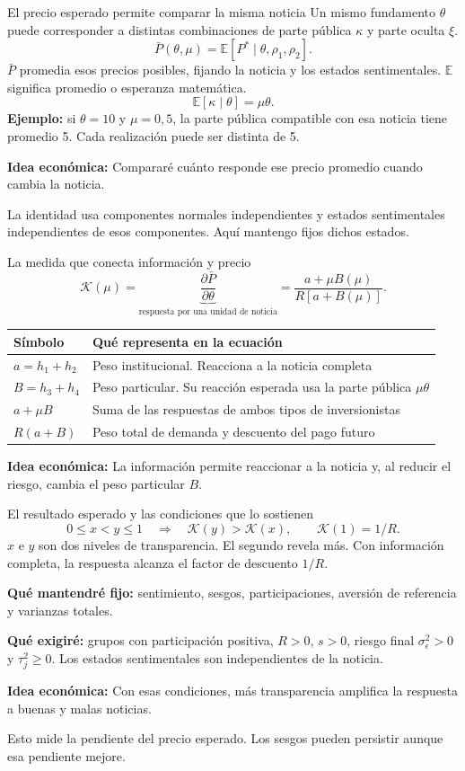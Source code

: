 \documentclass[aspectratio=169,11pt]{beamer}
\newcommand{\E}{\mathbb E}
\newcommand{\idea}[1]{\par\medskip\textbf{Idea económica:} #1}
\begin{document}
\begin{frame}{El precio esperado permite comparar la misma noticia}
 Un mismo fundamento \(\theta\) puede corresponder a distintas combinaciones
 de parte pública \(\kappa\) y parte oculta \(\xi\).
 \[
  \bar P(\theta,\mu)=\E[P^*\mid\theta,\rho_1,\rho_2].
 \]
 \(\bar P\) promedia esos precios posibles, fijando la noticia y
 los estados sentimentales. \(\E\) significa promedio o esperanza matemática.
 \[
  \E[\kappa\mid\theta]=\mu\theta.
 \]
 \textbf{Ejemplo:} si \(\theta=10\) y \(\mu=0{,}5\),
 la parte pública compatible con esa noticia tiene promedio 5.
 Cada realización puede ser distinta de 5.
 \idea{Compararé cuánto responde ese precio promedio cuando cambia la noticia.}
 \small\par\medskip
 La identidad usa componentes normales independientes y estados sentimentales
 independientes de esos componentes. Aquí mantengo fijos dichos estados.
\end{frame}
\begin{frame}{La medida que conecta información y precio}
 \[
  \mathcal K(\mu)=\underbrace{\frac{\partial\bar P}{\partial\theta}}_
      {\text{respuesta por una unidad de noticia}}
  =\frac{a+\mu B(\mu)}{R[a+B(\mu)]}.
 \]
 \begin{center}
 \begin{tabular}{lp{9.1cm}}
 \toprule
 Símbolo & Qué representa en la ecuación\\
 \midrule
 \(a=h_1+h_2\) & Peso institucional. Reacciona a la noticia completa\\[0.1cm]
 \(B=h_3+h_4\) & Peso particular. Su reacción esperada usa la parte pública \(\mu\theta\)\\[0.1cm]
 \(a+\mu B\) & Suma de las respuestas de ambos tipos de inversionistas\\[0.1cm]
 \(R(a+B)\) & Peso total de demanda y descuento del pago futuro\\
 \bottomrule
 \end{tabular}
 \end{center}
 \idea{La información permite reaccionar a la noticia y, al reducir el riesgo, cambia el peso particular \(B\).}
\end{frame}
\begin{frame}{El resultado esperado y las condiciones que lo sostienen}
 \[
  0\leq x<y\leq1
  \quad\Longrightarrow\quad
  \mathcal K(y)>\mathcal K(x),\qquad \mathcal K(1)=1/R.
 \]
 \(x\) e \(y\) son dos niveles de transparencia. El segundo revela más.
 Con información completa, la respuesta alcanza el factor de descuento \(1/R\).
 \medskip
 \par\textbf{Qué mantendré fijo:}
 sentimiento, sesgos, participaciones, aversión de referencia
 y varianzas totales.
 \medskip
 \par\textbf{Qué exigiré:}
 grupos con participación positiva, \(R>0\), \(s>0\),
 riesgo final \(\sigma_\epsilon^2>0\) y \(\tau_j^2\geq0\).
 Los estados sentimentales son independientes de la noticia.
 \idea{Con esas condiciones, más transparencia amplifica la respuesta a buenas y malas noticias.}
 \small\par\medskip
 Esto mide la pendiente del precio esperado. Los sesgos pueden persistir
 aunque esa pendiente mejore.
\end{frame}
\end{document}
